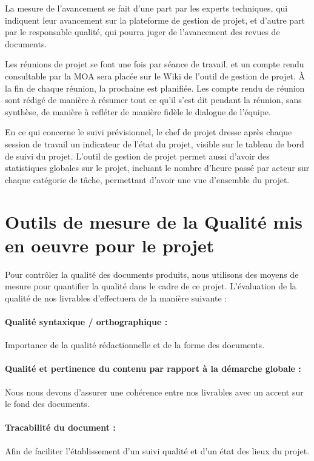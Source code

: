 \documentclass[a4paper, 18pt]{article}
\begin{document}
La mesure de l'avancement se fait d'une part par les experts techniques, qui indiquent leur avancement sur la plateforme de gestion de projet, et d'autre part par le responsable qualité, qui pourra juger de l'avancement des revues de documents.

Les réunions de projet se font une fois par séance de travail, et un compte rendu consultable par la MOA sera placée sur le Wiki de l'outil de gestion de projet. À la fin de chaque réunion, la prochaine est planifiée. Les compte rendu de réunion sont rédigé de manière à résumer tout ce qu'il s'est dit pendant la réunion, sans synthèse, de manière à refléter de manière fidèle le dialogue de l'équipe.

En ce qui concerne le suivi prévisionnel, le chef de projet dresse après chaque session de travail un indicateur de l'état du projet, visible sur le tableau de bord de suivi du projet. L'outil de gestion de projet permet aussi d'avoir des statistiques globales sur le projet, incluant le nombre d'heure passé par acteur sur chaque catégorie de tâche, permettant d'avoir une vue d'ensemble du projet.

\section{Outils de mesure de la Qualité mis en oeuvre pour le projet}

Pour contrôler la qualité des documents produits, nous utilisons des moyens de mesure pour quantifier la qualité dans le cadre de ce projet. L'évaluation de la qualité de nos livrables d'effectuera de la manière suivante :

\paragraph*{Qualité syntaxique / orthographique :} Importance de la qualité rédactionnelle et de la forme des documents.
\paragraph*{Qualité et pertinence du contenu par rapport à la démarche globale :} Nous nous devons d’assurer une cohérence entre nos livrables avec un accent sur le fond des documents.
\paragraph*{Tracabilité du document :} Afin de faciliter l’établissement d’un suivi qualité et d’un état des lieux du projet.
\end{document}
